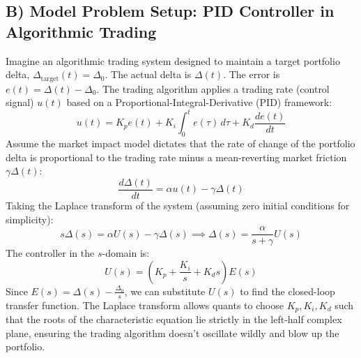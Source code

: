 \documentclass[11pt, letterpaper]{article}
\theoremstyle{definition}
\theoremstyle{remark}
\begin{document}
\subsection{B) Model Problem Setup: PID Controller in Algorithmic Trading}
Imagine an algorithmic trading system designed to maintain a target portfolio delta, $\Delta_{\text{target}}(t) = \Delta_0$. The actual delta is $\Delta(t)$. The error is $e(t) = \Delta(t) - \Delta_0$. The trading algorithm applies a trading rate (control signal) $u(t)$ based on a Proportional-Integral-Derivative (PID) framework:
\[ u(t) = K_p e(t) + K_i \int_{0}^{t} e(\tau) \, d\tau + K_d \frac{de(t)}{dt} \]
Assume the market impact model dictates that the rate of change of the portfolio delta is proportional to the trading rate minus a mean-reverting market friction $\gamma \Delta(t)$:
\[ \frac{d\Delta(t)}{dt} = \alpha u(t) - \gamma \Delta(t) \]
Taking the Laplace transform of the system (assuming zero initial conditions for simplicity):
\[ s\Delta(s) = \alpha U(s) - \gamma \Delta(s) \implies \Delta(s) = \frac{\alpha}{s + \gamma} U(s) \]
The controller in the $s$-domain is:
\[ U(s) = \left( K_p + \frac{K_i}{s} + K_d s \right) E(s) \]
Since $E(s) = \Delta(s) - \frac{\Delta_0}{s}$, we can substitute $U(s)$ to find the closed-loop transfer function. The Laplace transform allows quants to choose $K_p, K_i, K_d$ such that the roots of the characteristic equation lie strictly in the left-half complex plane, ensuring the trading algorithm doesn't oscillate wildly and blow up the portfolio.
\end{document}
